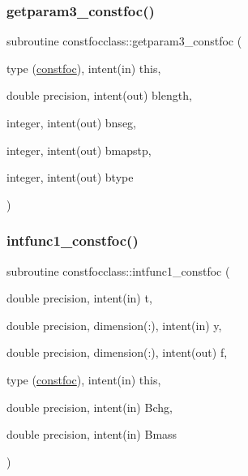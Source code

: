 \mbox{\label{namespaceconstfocclass_ae1fe9fc46cca742a797c388465086489}} 
\subsubsection{\texorpdfstring{getparam3\_constfoc()}{getparam3\_constfoc()}}
{\footnotesize\ttfamily subroutine constfocclass\+::getparam3\+\_\+constfoc (\begin{DoxyParamCaption}\item[{type (\mbox{\hyperlink{namespaceconstfocclass_structconstfocclass_1_1constfoc}{constfoc}}), intent(in)}]{this,  }\item[{double precision, intent(out)}]{blength,  }\item[{integer, intent(out)}]{bnseg,  }\item[{integer, intent(out)}]{bmapstp,  }\item[{integer, intent(out)}]{btype }\end{DoxyParamCaption})}

\mbox{\label{namespaceconstfocclass_a6cedac4005af8166900c4d4b1afd707b}} 
\subsubsection{\texorpdfstring{intfunc1\_constfoc()}{intfunc1\_constfoc()}}
{\footnotesize\ttfamily subroutine constfocclass\+::intfunc1\+\_\+constfoc (\begin{DoxyParamCaption}\item[{double precision, intent(in)}]{t,  }\item[{double precision, dimension(\+:), intent(in)}]{y,  }\item[{double precision, dimension(\+:), intent(out)}]{f,  }\item[{type (\mbox{\hyperlink{namespaceconstfocclass_structconstfocclass_1_1constfoc}{constfoc}}), intent(in)}]{this,  }\item[{double precision, intent(in)}]{Bchg,  }\item[{double precision, intent(in)}]{Bmass }\end{DoxyParamCaption})}


